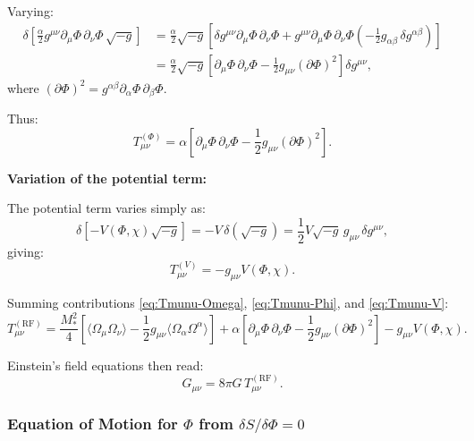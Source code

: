 \documentclass[11pt,a4paper]{article}
\numberwithin{equation}{section}
\theoremstyle{plain}
\theoremstyle{definition}
\theoremstyle{remark}
\begin{document}
Varying:
\begin{align}
\delta\left[\frac{\alpha}{2}g^{\mu\nu}\partial_\mu\Phi\,\partial_\nu\Phi\,\sqrt{-g}\right] &= \frac{\alpha}{2}\sqrt{-g}\left[\delta g^{\mu\nu}\partial_\mu\Phi\,\partial_\nu\Phi + g^{\mu\nu}\partial_\mu\Phi\,\partial_\nu\Phi\left(-\frac{1}{2}g_{\alpha\beta}\,\delta g^{\alpha\beta}\right)\right]\\
&= \frac{\alpha}{2}\sqrt{-g}\left[\partial_\mu\Phi\,\partial_\nu\Phi - \frac{1}{2}g_{\mu\nu}(\partial\Phi)^2\right]\delta g^{\mu\nu},
\end{align}
where $(\partial\Phi)^2 = g^{\alpha\beta}\partial_\alpha\Phi\,\partial_\beta\Phi$.

Thus:
\begin{equation}
T_{\mu\nu}^{(\Phi)} = \alpha\left[\partial_\mu\Phi\,\partial_\nu\Phi - \frac{1}{2}g_{\mu\nu}(\partial\Phi)^2\right].
\label{eq:Tmunu-Phi}
\end{equation}

\textbf{Variation of the potential term:}

The potential term varies simply as:
\begin{equation}
\delta\left[-V(\Phi,\chi)\sqrt{-g}\right] = -V\,\delta(\sqrt{-g}) = \frac{1}{2}V\sqrt{-g}\,g_{\mu\nu}\,\delta g^{\mu\nu},
\end{equation}
giving:
\begin{equation}
T_{\mu\nu}^{(V)} = -g_{\mu\nu}V(\Phi,\chi).
\label{eq:Tmunu-V}
\end{equation}

Summing contributions \eqref{eq:Tmunu-Omega}, \eqref{eq:Tmunu-Phi}, and \eqref{eq:Tmunu-V}:
\begin{equation}
T_{\mu\nu}^{(\mathrm{RF})} = \frac{M_*^2}{4}\left[\langle \Omega_\mu \Omega_\nu \rangle - \frac{1}{2}g_{\mu\nu}\langle \Omega_\alpha \Omega^\alpha \rangle\right] + \alpha\left[\partial_\mu\Phi\,\partial_\nu\Phi - \frac{1}{2}g_{\mu\nu}(\partial\Phi)^2\right] - g_{\mu\nu}V(\Phi,\chi).
\label{eq:Tmunu-full}
\end{equation}

Einstein's field equations then read:
\begin{equation}
G_{\mu\nu} = 8\pi G\, T_{\mu\nu}^{(\mathrm{RF})}.
\label{eq:einstein-rf}
\end{equation}

\subsubsection{Equation of Motion for $\Phi$ from $\delta S/\delta\Phi = 0$}
\end{document}
